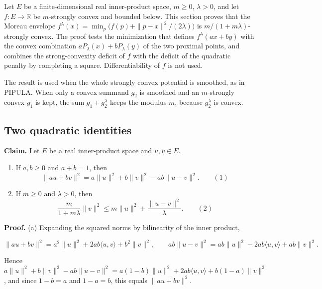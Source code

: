 \documentclass[11pt,a4paper]{report}
\begin{document}
Let \(E\) be a finite-dimensional real inner-product space, \(m\ge0\), \(\lambda>0\), and let \(f:E\to\mathbb R\) be \(m\)-strongly convex and bounded below. This section proves that the Moreau envelope \(f^\lambda(x)=\min_p\bigl(f(p)+\|p-x\|^2/(2\lambda)\bigr)\) is \(m/(1+m\lambda)\)-strongly convex. The proof tests the minimization that defines \(f^\lambda(ax+by)\) with the convex combination \(aP_\lambda(x)+bP_\lambda(y)\) of the two proximal points, and combines the strong-convexity deficit of \(f\) with the deficit of the quadratic penalty by completing a square. Differentiability of \(f\) is not used.




The result is used when the whole strongly convex potential is smoothed, as in PIPULA. When only a convex summand \(g_2\) is smoothed and an \(m\)-strongly convex \(g_1\) is kept, the sum \(g_1+g_2^\lambda\) keeps the modulus \(m\), because \(g_2^\lambda\) is convex.

\subsection{\texorpdfstring{Two quadratic identities}{Two quadratic identities}}
\label{report-step-ProximalLangevin-StrongMoreau-lean-1}


\textbf{Claim.} Let \(E\) be a real inner-product space and \(u,v\in E\).



\begin{enumerate}


\item If \(a,b\ge0\) and \(a+b=1\), then
\[\|au+bv\|^2=a\|u\|^2+b\|v\|^2-ab\|u-v\|^2.\qquad(1)\]

\item If \(m\ge0\) and \(\lambda>0\), then
\[\frac{m}{1+m\lambda}\|v\|^2\le m\|u\|^2+\frac{\|u-v\|^2}{\lambda}.\qquad(2)\]

\end{enumerate}



\textbf{Proof.} (a) Expanding the squared norms by bilinearity of the inner product,


\[\|au+bv\|^2=a^2\|u\|^2+2ab\langle u,v\rangle+b^2\|v\|^2,\qquad ab\|u-v\|^2=ab\|u\|^2-2ab\langle u,v\rangle+ab\|v\|^2.\]


Hence \(a\|u\|^2+b\|v\|^2-ab\|u-v\|^2=a(1-b)\|u\|^2+2ab\langle u,v\rangle+b(1-a)\|v\|^2\), and since \(1-b=a\) and \(1-a=b\), this equals \(\|au+bv\|^2\).
\end{document}
